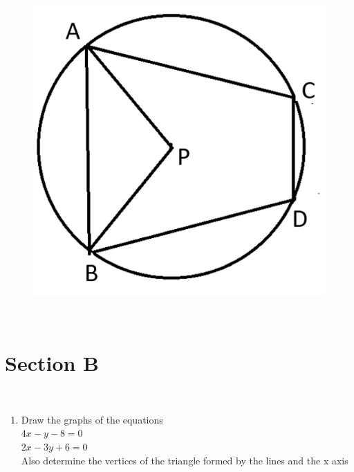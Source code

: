 \documentclass[journal,12pt,twocolumn]{IEEEtran}
\begin{document}
\begin{enumerate}[label=1.\arabic*]
\begin{figure}[width=0.5\columnwidth,center]
\centering
\includegraphics[scale = 0.4]{fig 1.2}\\
\caption{}
\label{Fig 2}
\end{figure}

\vspace{1mm}\\
\section{Section B}
\vspace{3mm}\\
\begin{enumerate}[label=2.\arabic*]
\item Draw the graphs of the equations\\
$ 4x - y - 8 = 0 $\\
$ 2x - 3y + 6 = 0 $\\
Also determine the vertices of the triangle formed by the lines and the
x axis\\


\end{enumerate}
\end{enumerate}
\end{document}
